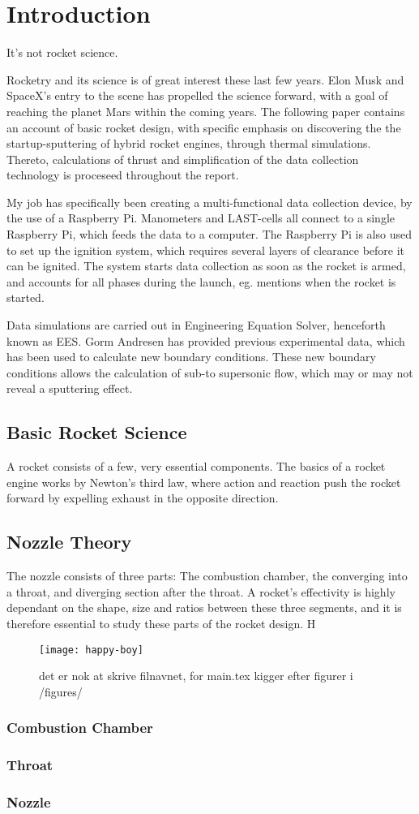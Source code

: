 \chapter{Introduction}

It's not rocket science.

Rocketry and its science is of great interest these last few years. Elon Musk and SpaceX's entry to the scene has propelled the science forward, with a goal of reaching the planet Mars within the coming years. The following paper contains an account of basic rocket design, with specific emphasis on discovering the the startup-sputtering of hybrid rocket engines, through thermal simulations. Thereto, calculations of thrust and simplification of the data collection technology is proceseed throughout the report.

My job has specifically been creating a multi-functional data collection device, by the use of a Raspberry Pi. Manometers and LAST-cells all connect to a single Raspberry Pi, which feeds the data to a computer. The Raspberry Pi is also used to set up the ignition system, which requires several layers of clearance before it can be ignited. The system starts data collection as soon as the rocket is armed, and accounts for all phases during the launch, eg. mentions when the rocket is started.

Data simulations are carried out in Engineering Equation Solver, henceforth known as EES. Gorm Andresen has provided previous experimental data, which has been used to calculate new boundary conditions. These new boundary conditions allows the calculation of sub-to supersonic flow, which may or may not reveal a sputtering effect.

\section{Basic Rocket Science}

A rocket consists of a few, very essential components. The basics of a rocket engine works by Newton's third law, where action and reaction push the rocket forward by expelling exhaust in the opposite direction.

\section{Nozzle Theory}

The nozzle consists of three parts: The combustion chamber, the converging into a throat, and diverging section after the throat. A rocket's effectivity is highly dependant on the shape, size and ratios between these three segments, and it is therefore essential to study these parts of the rocket design.
H
\begin{figure}
\texttt{[image: happy-boy]}
\caption{det er nok at skrive filnavnet, for main.tex kigger efter figurer i /figures/}
\label{fig:yyy}
\end{figure}


\subsection{Combustion Chamber}
\subsection{Throat}
\subsection{Nozzle}
